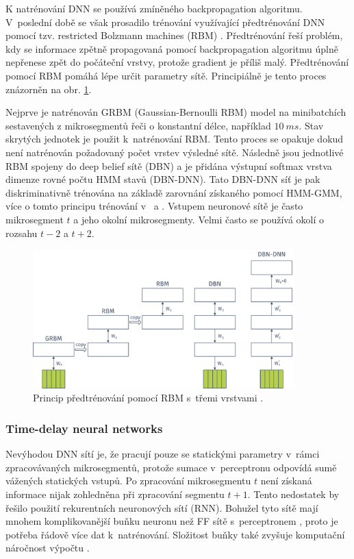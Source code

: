 K natrénování DNN se používá zmíněného backpropagation algoritmu. V~poslední době se však prosadilo trénování využívající předtrénování DNN pomocí tzv. restricted Bolzmann machines (RBM) \cite{Hinton2012}. Předtrénování řeší problém, kdy se informace zpětně propagovaná pomocí backpropagation algoritmu úplně nepřenese zpět do počáteční vrstvy, protože gradient je příliš malý. Předtrénování pomocí RBM pomáhá lépe určit parametry sítě. Principiálně je tento proces znázorněn na obr. \ref{fig:asr:acoustic:dnn:pretraining}.

Nejprve je natrénován GRBM (Gaussian-Bernoulli RBM) model na minibatchích sestavených z mikrosegmentů řeči o konstantní délce, například $10\ ms$. Stav skrytých jednotek je použit  k~natrénování RBM. Tento proces se opakuje dokud není natrénován požadovaný počet vrstev výsledné sítě. Následně jsou jednotlivé RBM spojeny do deep belief sítě (DBN) a je přidána výstupní softmax vrstva dimenze rovné počtu HMM stavů (DBN-DNN). Tato DBN-DNN síť je pak diskriminativně trénována na základě zarovnání získaného pomocí HMM-GMM, více o tomto principu trénování v~\cite{Hinton2012} a \cite{Vesely2013}. Vstupem neuronové sítě je často mikrosegment $t$ a jeho okolní mikrosegmenty. Velmi často se používá okolí o rozsahu $t-2$ a $t+2$.

\begin{figure}[hbpt]
  \centering
  \includegraphics[width=0.9\textwidth]{./ch4-asr/img/pretraining.pdf}
  \caption[Princip předtrénování pomocí RBM.]{Princip předtrénování pomocí RBM s~třemi vrstvami \cite{Hinton2012}.}
  \label{fig:asr:acoustic:dnn:pretraining}
\end{figure}

\subsubsection{Time-delay neural networks}

Nevýhodou DNN sítí je, že pracují pouze se statickými parametry v~rámci zpracovávaných mikrosegmentů, protože sumace v~perceptronu odpovídá sumě vážených statických vstupů. Po zpracování mikrosegmentu $t$ není získaná informace nijak zohledněna při zpracování segmentu $t+1$. Tento nedostatek by řešilo použití rekurentních neuronových sítí (RNN). Bohužel tyto sítě mají mnohem komplikovanější buňku neuronu než FF sítě s~perceptronem \cite{Amodei2016}, proto je potřeba řádově více dat k~natrénování. Složitost buňky také zvyšuje komputační náročnost výpočtu \cite{Hannun2014}.

